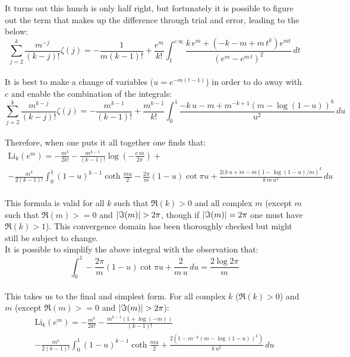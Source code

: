 \documentclass[12pt]{article}
\DeclarePairedDelimiter\abs{\lvert}{\rvert}%
\begin{document}
It turns out this hunch is only half right, but fortunately it is possible to figure out the term that makes up the difference through trial and error, leading to the below:
\begin{equation} \nonumber
\sum_{j=2}^{k}\frac{m^{-j}}{(k-j)!}\zeta(j)=-\frac{1}{m(k-1)!}+\frac{e^m}{k!}\int_{1}^{c\,\infty}\frac{k\,e^{m}+(-k-m+m\,t^k)e^{mt}}{\left(e^{m}-e^{m\,t}\right)^2}\,dt
\end{equation}\\
\indent It is best to make a change of variables ($u=e^{-m(t-1)}$) in order to do away with $c$ and enable the combination of the integrals:
\begin{equation} \nonumber
\sum_{j=2}^{k}\frac{m^{k-j}}{(k-j)!}\zeta(j)=-\frac{m^{k-1}}{(k-1)!}+\frac{m^{k-1}}{k!}\int_{0}^{1}\frac{-k\,u-m+m^{-k+1}\left(m-\log{(1-u)}\right)^k}{u^2}\,du
\end{equation}\\
\indent Therefore, when one puts it all together one finds that:
\begin{multline} \nonumber
\mathrm{Li}_{k}(e^{m})=-\frac{m^{k}}{2k!}-\frac{m^{k-1}}{(k-1)!}\log{\left(-\frac{e\,m}{2\pi}\right)}+\\
-\frac{m^{k}}{2(k-1)!}\int_{0}^{1}(1-u)^{k-1}\coth{\frac{m u}{2}}-\frac{2\pi}{m}(1-u)\cot{\pi u}+\frac{2(k\,u+m-m(1-\log{(1-u)/m})^k}{k\,m\,u^2}\,du
\end{multline}\\
\indent This formula is valid for all $k$ such that $\Re{(k)}>0$ and all complex $m$ (except $m$ such that $\Re{(m)}>=0$ and $\abs{\Im{(m)}}>2\pi$, though if $\abs{\Im{(m)}}=2\pi$ one must have $\Re{(k)}>1$). This convergence domain has been thoroughly checked but might still be subject to change.\\

It is possible to simplify the above integral with the observation that:
\begin{equation} \nonumber
\int_{0}^{1}-\frac{2\pi}{m}(1-u)\cot{\pi u}+\frac{2}{m\,u}\,du=\frac{2\log2\pi}{m} \text{}
\end{equation}\\
\indent This takes us to the final and simplest form. For all complex $k$ ($\Re{(k)}>0$) and $m$ (except $\Re{(m)}>=0$ and $\abs{\Im{(m)}}>2\pi$):
\begin{multline} \nonumber
\mathrm{Li}_{k}(e^{m})=-\frac{m^{k}}{2k!}-\frac{m^{k-1}\left(1+\log{(-m)}\right)}{(k-1)!}\\
-\frac{m^{k}}{2(k-1)!}\int_{0}^{1}(1-u)^{k-1}\coth{\frac{m u}{2}}+\frac{2\left(1-m^{-k}(m-\log{(1-u)})^k\right)}{k\,u^2}\,du
\end{multline}
\end{document}
